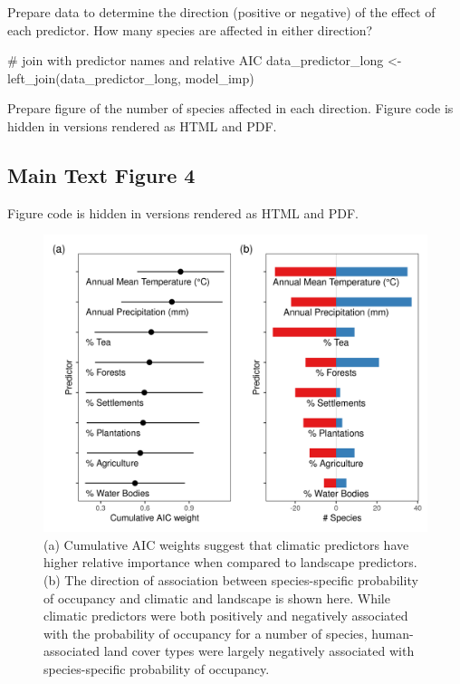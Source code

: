 \documentclass[]{article}
\newenvironment{Shaded}{}{}
\newcommand{\CommentTok}[1]{\textcolor[rgb]{0.00,0.50,0.00}{#1}}
\newcommand{\KeywordTok}[1]{\textcolor[rgb]{0.00,0.00,1.00}{#1}}
\newcommand{\NormalTok}[1]{#1}
\newcommand{\StringTok}[1]{\textcolor[rgb]{0.00,0.50,0.50}{#1}}
\begin{document}
Prepare data to determine the direction (positive or negative) of the effect of each predictor. How many species are affected in either direction?

\begin{Shaded}
\begin{Highlighting}[numbers=left,,]
\CommentTok{# join with predictor names and relative AIC}
\NormalTok{data_predictor_long <-}\StringTok{ }\KeywordTok{left_join}\NormalTok{(data_predictor_long, model_imp)}
\end{Highlighting}
\end{Shaded}

Prepare figure of the number of species affected in each direction. Figure code is hidden in versions rendered as HTML and PDF.

\hypertarget{main-text-figure-4}{%
\subsection{Main Text Figure 4}\label{main-text-figure-4}}

Figure code is hidden in versions rendered as HTML and PDF.

\begin{figure}
\centering
\includegraphics{figs/fig_04_aic_weight_effect.png}
\caption{(a) Cumulative AIC weights suggest that climatic predictors have higher relative importance when compared to landscape predictors. (b) The direction of association between species-specific probability of occupancy and climatic and landscape is shown here. While climatic predictors were both positively and negatively associated with the probability of occupancy for a number of species, human-associated land cover types were largely negatively associated with species-specific probability of occupancy.}
\end{figure}
\end{document}
